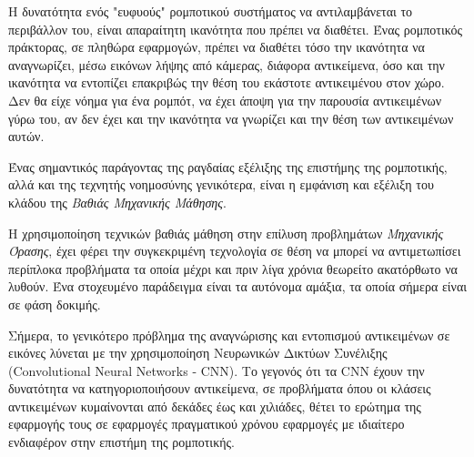Η δυνατότητα ενός "ευφυούς" ρομποτικού συστήματος να αντιλαμβάνεται
το περιβάλλον του, είναι απαραίτητη ικανότητα που πρέπει να διαθέτει.
Ένας ρομποτικός πράκτορας, σε πληθώρα εφαρμογών, πρέπει να διαθέτει τόσο την
ικανότητα να αναγνωρίζει, μέσω εικόνων λήψης από κάμερας, διάφορα αντικείμενα,
όσο και την ικανότητα να εντοπίζει επακριβώς την θέση του
εκάστοτε αντικειμένου στον χώρο. Δεν θα είχε νόημα για ένα ρομπότ, να έχει άποψη
για την παρουσία αντικειμένων γύρω του, αν δεν έχει και την ικανότητα να γνωρίζει
και την θέση των αντικειμένων αυτών.

Ένας σημαντικός παράγοντας της ραγδαίας εξέλιξης της επιστήμης της ρομποτικής, αλλά
και της τεχνητής νοημοσύνης γενικότερα, είναι η εμφάνιση και εξέλιξη του κλάδου
της \emph{Βαθιάς Μηχανικής Μάθησης}.

Η χρησιμοποίηση τεχνικών βαθιάς μάθηση στην επίλυση προβλημάτων \emph{Μηχανικής Όρασης},
έχει φέρει την συγκεκριμένη τεχνολογία σε θέση να μπορεί να αντιμετωπίσει
περίπλοκα προβλήματα τα οποία μέχρι και πριν λίγα χρόνια θεωρείτο ακατόρθωτο να λυθούν.
Ένα στοχευμένο παράδειγμα είναι τα αυτόνομα αμάξια, τα οποία σήμερα είναι σε
φάση δοκιμής.

Σήμερα, το γενικότερο πρόβλημα της αναγνώρισης και εντοπισμού αντικειμένων σε εικόνες
λύνεται με την χρησιμοποίηση Νευρωνικών Δικτύων Συνέλιξης (Convolutional Neural Networks - CNN).
Το γεγονός ότι τα CNN έχουν την δυνατότητα να κατηγοριοποιήσουν αντικείμενα,
σε προβλήματα όπου οι κλάσεις αντικειμένων κυμαίνονται από δεκάδες έως και χιλιάδες,
θέτει το ερώτημα της εφαρμογής τους σε εφαρμογές πραγματικού χρόνου εφαρμογές
με ιδιαίτερο ενδιαφέρον στην επιστήμη της ρομποτικής.




